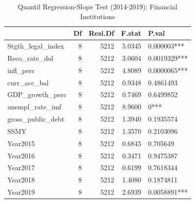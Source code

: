 \begin{table}[ht]
\centering
\caption{Quantil Regression-Slope Test (2014-2019): Financial Institutions} 
\begingroup\small
\begin{tabular}{lrrrl}
  \toprule
 & Df & Resi.Df & F.stat & P.val \\ 
  \midrule
Stgth\_legal\_index & 8 & 5212 & 5.0345 & 0.000003*** \\ 
  Reco\_rate\_dol & 8 & 5212 & 3.0604 & 0.0019329*** \\ 
  infl\_perc & 8 & 5212 & 4.8089 & 0.0000065*** \\ 
  curr\_acc\_bal & 8 & 5212 & 0.9348 & 0.4861493 \\ 
  GDP\_growth\_perc & 8 & 5212 & 0.7469 & 0.6499852 \\ 
  unempl\_rate\_imf & 8 & 5212 & 8.9600 & 0*** \\ 
  gross\_public\_debt & 8 & 5212 & 1.3940 & 0.1935574 \\ 
  SSMY & 8 & 5212 & 1.3570 & 0.2103096 \\ 
  Year2015 & 8 & 5212 & 0.6845 & 0.705649 \\ 
  Year2016 & 8 & 5212 & 0.3471 & 0.9475387 \\ 
  Year2017 & 8 & 5212 & 0.6199 & 0.7618344 \\ 
  Year2018 & 8 & 5212 & 1.4080 & 0.1874811 \\ 
  Year2019 & 8 & 5212 & 2.6939 & 0.0058891*** \\ 
   \bottomrule
\end{tabular}
\endgroup
\end{table}
